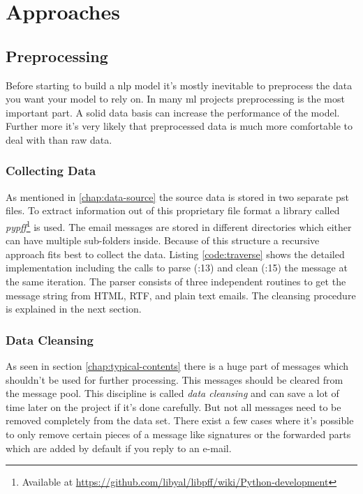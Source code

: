 \chapter{Approaches}

\section{Preprocessing}

Before starting to build a \acrshort{nlp} model it's mostly inevitable to preprocess the data you want your model to rely on. In many
\acrlong{ml} projects preprocessing is the most important part. A solid data basis can increase the performance of the model. Further
more it's very likely that preprocessed data is much more comfortable to deal with than raw data.

\subsection{Collecting Data}

As mentioned in \ref{chap:data-source} the source data is stored in two separate \acrshort{pst} files. To extract information out of this
proprietary file format a library called \emph{pypff}\footnote{Available at \url{https://github.com/libyal/libpff/wiki/Python-development}}
is used. The email messages are stored in different directories which either can have multiple sub-folders inside. Because of this structure
a recursive approach fits best to collect the data. Listing \ref{code:traverse} shows the detailed implementation including the calls to
parse (:13) and clean (:15) the message at the same iteration. The parser consists of three independent routines to get the message string
from HTML, RTF, and plain text emails. The cleansing procedure is explained in the next section.

\subsection{Data Cleansing}

As seen in section \ref{chap:typical-contents} there is a huge part of messages which shouldn't be used for further processing. This messages
should be cleared from the message pool. This discipline is called \emph{data cleansing} and can save a lot of time later on the project if
it's done carefully. But not all messages need to be removed completely from the data set. There exist a few cases where it's possible to only
remove certain pieces of a message like signatures or the forwarded parts which are added by default if you reply to an e-mail.

